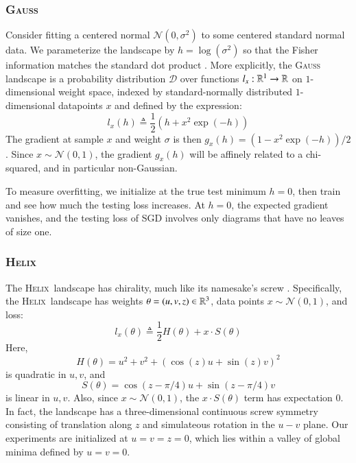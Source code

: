 \documentclass[anon,12pt]{colt2021} %
\newcommand{\wrap}[1]{\left(#1\right)}
\newcommand{\Dd}{\mathcal{D}}
\newcommand{\Nn}{\mathcal{N}}   \newcommand{\NN}{\mathbb{N}}
\newcommand{\Gauss}{\textsc{Gauss}}
\newcommand{\Helix}{\textsc{Helix}}
\begin{document}
        \subsubsection{\Gauss}
            Consider fitting a centered normal $\Nn(0, \sigma^2)$ to some
            centered standard normal data.  We parameterize the landscape by
            $h=\log(\sigma^2)$ so that the Fisher information matches the
            standard dot product \citep{am98}.   
            More explicitly, the \Gauss\, landscape is a probability
            distribution $\Dd$ over functions $l_x:\mathbb{R}^1\to \mathbb{R}$ on
            $1$-dimensional weight space, indexed by standard-normally
            distributed $1$-dimensional datapoints $x$ and defined by the
            expression:
            $$
                l_x(h)
                \triangleq
                \frac{1}{2} \wrap{h + x^2 \exp(-h)}
            $$
            The gradient at sample $x$ and weight $\sigma$ is then $g_x(h) =
            (1-x^2\exp(-h))/2$.  Since $x\sim \Nn(0, 1)$, the gradient $g_x(h)$
            will be affinely related to a chi-squared, and in particular
            non-Gaussian.
            
            To measure overfitting, we initialize at the true test minimum
            $h=0$, then train and see how much the testing loss increases.  At
            $h=0$, the expected gradient vanishes, and the testing loss of SGD
            involves only diagrams that have no leaves of size one.
            
        \subsubsection{\Helix}
            The \Helix\, landscape has chirality, much like its namesake's
            screw \cite{vi00}.  Specifically, the \Helix\ landscape has
            weights     $\theta = (u,v,z) \in \mathbb{R}^3$,
            data points $x \sim \Nn(0, 1)$,
            and loss:
            $$
                l_x(\theta)
                \triangleq
                \frac{1}{2} H(\theta) + x \cdot S(\theta)
            $$
            Here,
            $$
                H(\theta) = u^2 + v^2 + (\cos(z) u + \sin(z) v)^2
            $$
            is quadratic in $u, v$, and
            $$
                S(\theta) = \cos(z-\pi/4) u + \sin(z-\pi/4) v
            $$
            is linear in $u, v$.
            Also, since $x \sim \Nn(0,1)$, the $x \cdot S(\theta)$ term has
            expectation $0$.
            In fact, the landscape has a three-dimensional continuous screw
            symmetry consisting of translation along $z$ and simulateous
            rotation in the $u-v$ plane.  Our experiments are initialized at
            $u=v=z=0$, which lies within a valley of global minima defined by
            $u=v=0$.  
\end{document}
